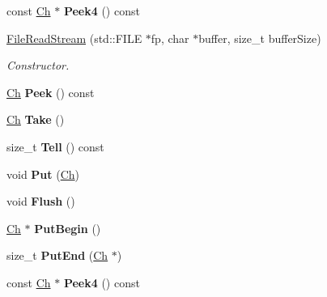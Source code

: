 \begin{DoxyCompactItemize}
\item 
const \hyperlink{class_file_read_stream_ae1f83d9ca3c76d1d151af0b6c427f046}{Ch} $\ast$ {\bfseries Peek4} () const \hypertarget{class_file_read_stream_a33ebc2af3a7dea770c70e9c1d53f0f91}{}\label{class_file_read_stream_a33ebc2af3a7dea770c70e9c1d53f0f91}

\item 
\hyperlink{class_file_read_stream_adf91191843d50b900f43cb4f35f16f67}{File\+Read\+Stream} (std\+::\+F\+I\+LE $\ast$fp, char $\ast$buffer, size\+\_\+t buffer\+Size)
\begin{DoxyCompactList}\small\item\em Constructor. \end{DoxyCompactList}\item 
\hyperlink{class_file_read_stream_ae1f83d9ca3c76d1d151af0b6c427f046}{Ch} {\bfseries Peek} () const \hypertarget{class_file_read_stream_ab129c5d15343488caf60b4fee48024fb}{}\label{class_file_read_stream_ab129c5d15343488caf60b4fee48024fb}

\item 
\hyperlink{class_file_read_stream_ae1f83d9ca3c76d1d151af0b6c427f046}{Ch} {\bfseries Take} ()\hypertarget{class_file_read_stream_addcbccc9d86ccbbe6d8e876ba595dbcb}{}\label{class_file_read_stream_addcbccc9d86ccbbe6d8e876ba595dbcb}

\item 
size\+\_\+t {\bfseries Tell} () const \hypertarget{class_file_read_stream_a9a2f09eb66ae912c4d5f472bdfdd92ce}{}\label{class_file_read_stream_a9a2f09eb66ae912c4d5f472bdfdd92ce}

\item 
void {\bfseries Put} (\hyperlink{class_file_read_stream_ae1f83d9ca3c76d1d151af0b6c427f046}{Ch})\hypertarget{class_file_read_stream_a4f2eac5b08033b1527bff517be657a36}{}\label{class_file_read_stream_a4f2eac5b08033b1527bff517be657a36}

\item 
void {\bfseries Flush} ()\hypertarget{class_file_read_stream_acd031e3f578b23bc2a792ac41e1e95ae}{}\label{class_file_read_stream_acd031e3f578b23bc2a792ac41e1e95ae}

\item 
\hyperlink{class_file_read_stream_ae1f83d9ca3c76d1d151af0b6c427f046}{Ch} $\ast$ {\bfseries Put\+Begin} ()\hypertarget{class_file_read_stream_ac985850ab75f204dc08a01d12a8ef5c6}{}\label{class_file_read_stream_ac985850ab75f204dc08a01d12a8ef5c6}

\item 
size\+\_\+t {\bfseries Put\+End} (\hyperlink{class_file_read_stream_ae1f83d9ca3c76d1d151af0b6c427f046}{Ch} $\ast$)\hypertarget{class_file_read_stream_a886660c89f698ff913d641d61466108f}{}\label{class_file_read_stream_a886660c89f698ff913d641d61466108f}

\item 
const \hyperlink{class_file_read_stream_ae1f83d9ca3c76d1d151af0b6c427f046}{Ch} $\ast$ {\bfseries Peek4} () const \hypertarget{class_file_read_stream_a33ebc2af3a7dea770c70e9c1d53f0f91}{}\label{class_file_read_stream_a33ebc2af3a7dea770c70e9c1d53f0f91}

\end{DoxyCompactItemize}


